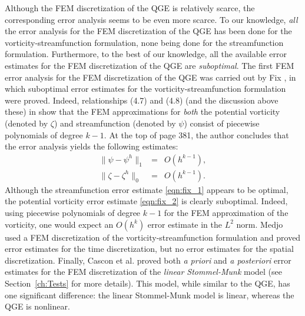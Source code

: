 Although the FEM discretization of the QGE is relatively scarce, the corresponding error analysis
seems to be even more scarce. To our knowledge, \emph{all} the error analysis for the FEM
discretization of the QGE has been done for the vorticity-streamfunction formulation, none being
done for the streamfunction formulation. Furthermore, to the best of our knowledge, all the
available error estimates for the FEM discretization of the QGE are \emph{suboptimal}. The first FEM
error analysis for the FEM discretization of the QGE was carried out by Fix \cite{Fix}, in which
suboptimal error estimates for the vorticity-streamfunction formulation were proved. Indeed,
relationships (4.7) and (4.8) (and the discussion above these) in \cite{Fix} show that the FEM
approximations for \emph{both} the potential vorticity (denoted by $\zeta$) and streamfunction
(denoted by $\psi$) consist of piecewise polynomials of degree $k-1$. At the top of page 381, the
author concludes that the error analysis yields the following estimates:
\begin{eqnarray}
  \| \psi - \psi^h \|_1 &=& O(h^{k-1}), \label{eqn:fix_1} \\
  \| \zeta - \zeta ^h \|_0 &=& O(h^{k-1}) . \label{eqn:fix_2}
\end{eqnarray}
Although the streamfunction error estimate \eqref{eqn:fix_1} appears to be optimal, the potential
vorticity error estimate \eqref{eqn:fix_2} is clearly suboptimal. Indeed, using piecewise
polynomials of degree $k-1$ for the FEM approximation of the vorticity, one would expect an $O(h^k)$
error estimate in the $L^2$ norm. Medjo \cite{Medjo99, Medjo00} used a FEM discretization of the
vorticity-streamfunction formulation and proved error estimates for the time discretization, but no
error estimates for the spatial discretization. Finally, Cascon et al. \cite{Cascon} proved both
\emph{a priori} and \emph{a posteriori} error estimates for the FEM discretization of the \emph{linear
Stommel-Munk} model (see Section~\ref{ch:Tests} for more details). This model, while similar to the
QGE, has one significant difference: the linear Stommel-Munk model is linear, whereas the QGE is
nonlinear.

